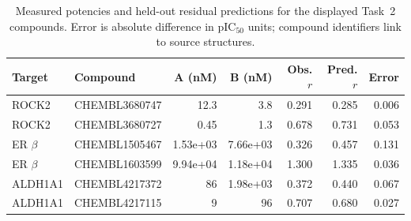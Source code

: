 \begin{table}[htbp]
\centering
\caption{Measured potencies and held-out residual predictions for the displayed Task~2 compounds. Error is absolute difference in pIC$_{50}$ units; compound identifiers link to source structures.}
\label{tab:caseprovenance}
\small
\begin{tabular}{@{}llrrrrr@{}}
\toprule
Target & Compound & A (nM) & B (nM) & Obs. $r$ & Pred. $r$ & Error \\
\midrule
ROCK2 & CHEMBL3680747 & 12.3 & 3.8 & 0.291 & 0.285 & 0.006 \\
ROCK2 & CHEMBL3680727 & 0.45 & 1.3 & 0.678 & 0.731 & 0.053 \\
ER $\beta$ & CHEMBL1505467 & 1.53e+03 & 7.66e+03 & 0.326 & 0.457 & 0.131 \\
ER $\beta$ & CHEMBL1603599 & 9.94e+04 & 1.18e+04 & 1.300 & 1.335 & 0.036 \\
ALDH1A1 & CHEMBL4217372 & 86 & 1.98e+03 & 0.372 & 0.440 & 0.067 \\
ALDH1A1 & CHEMBL4217115 & 9 & 96 & 0.707 & 0.680 & 0.027 \\
\bottomrule
\end{tabular}
\end{table}
